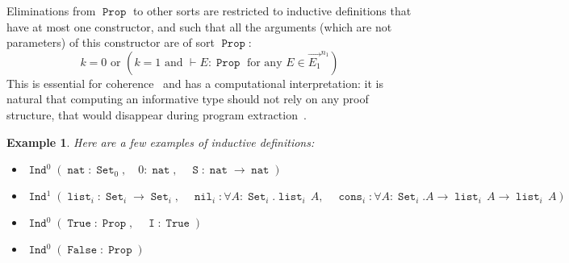 \documentclass[a4paper,USenglish]{lipics}
\newtheorem{exm}{Example}
\DeclareMathOperator{\Prop}{\mathtt{Prop}}
\DeclareMathOperator{\Set}{\mathtt{Set}}
\DeclareMathOperator{\Ind}{\mathtt{Ind}}
\DeclareMathOperator{\Nat}{\mathtt{nat}}
\DeclareMathOperator{\Succ}{\mathtt{S}}
\DeclareMathOperator{\List}{\mathtt{list}}
\DeclareMathOperator{\Vector}{\mathtt{vector}}
\DeclareMathOperator{\nil}{\mathtt{nil}}
\DeclareMathOperator{\cons}{\mathtt{cons}}
\DeclareMathOperator{\Vnil}{\mathtt{Vnil}}
\DeclareMathOperator{\Vcons}{\mathtt{Vcons}}
\DeclareMathOperator{\Land}{\mathtt{and}}
\DeclareMathOperator{\LI}{\mathtt{I}}
\DeclareMathOperator{\False}{\mathtt{False}}
\DeclareMathOperator{\True}{\mathtt{True}}
\DeclareMathOperator{\conj}{\mathtt{conj}}
\DeclareMathOperator{\Or}{\mathtt{or}}
\DeclareMathOperator{\Left}{\mathtt{left}}
\newcommand{\arrlong}[1]{\overrightarrow{#1}}
\newcommand\arn[2]{
{\arrlong{#1}}^{#2}
}
\begin{document}
Eliminations from $\Prop$ to other sorts are restricted to inductive
definitions that have at most one constructor, and such that all the
arguments (which are not parameters) of this constructor are of
sort $\Prop$:
\begin{equation}\label{eq:restr1}
  k = 0 \text{ or } \left(k = 1 \text{ and } \vdash E : \Prop \text{ for
    any } E ∈ \arn{E_1}{n_1}\right)
\end{equation}
This is essential for coherence~\cite{DBLP:conf/lics/Coquand86}
and has a computational interpretation: it is natural that computing an
informative type should not rely on any proof structure, that would
disappear during program
extraction~\cite{DBLP:conf/types/Letouzey02,letouzey04}.

\begin{exm} Here are a few examples of inductive definitions:
 \begin{itemize}
  \item $\Ind^0 (\Nat : \Set_0, \quad 0 : \Nat, \quad \Succ : \Nat → \Nat)$
  \item $\Ind^1 (\List_i : \Set_i → \Set_i, \quad \nil_i : ∀A:\Set_i.\List_i\,A, \quad \cons_i :∀A:\Set_i. A →  \List_i\,A → \List_i\,A)$
\begin{comment}
  \item $\begin{aligned}\Ind^1 (&\Vector_i : \Set_i → \Nat → \Set_{i+1},  \\
                 &\Vnil_i : ∀A:\Set_i.\Vector_i\,A\,\,0, \\
                 &\Vcons_i : ∀(A:\Set_i)(n:\Nat). A → \Vector_i\,A\,n → \Vector_i\,A\,(\Succ\,n))\end{aligned}$
\end{comment}
  \item $\Ind^0(\True : \Prop, \quad \LI : \True) $
  \item $\Ind^0(\False : \Prop)$
\begin{comment}
  \item $\begin{aligned}\Ind^2(&\Land : \Prop → \Prop → \Prop,\\
                               &\conj :∀(A\,B:\Prop).A → B → \Land\,A\,B) ∈ \E\end{aligned}$
  \item $\begin{aligned}\Ind^2(&\Or : \Prop → \Prop → \Prop,\\
                               &\Left :∀(A\,B:\Prop).A → \Or\,A\,B \\

\end{comment}
\end{itemize}
\end{exm}
\end{document}

